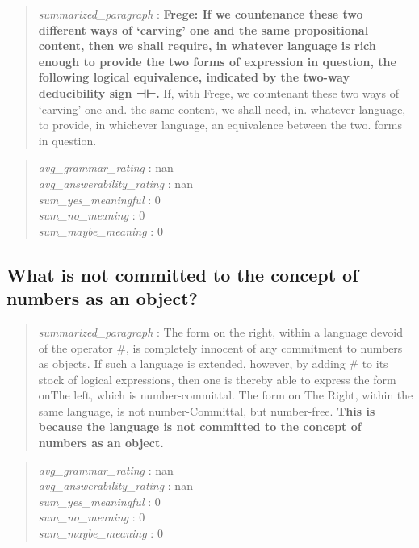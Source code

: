 \begin{quote}
\emph{summarized\_paragraph} : \textbf{Frege: If we countenance these
two different ways of `carving' one and the same propositional content,
then we shall require, in whatever language is rich enough to provide
the two forms of expression in question, the following logical
equivalence, indicated by the two-way deducibility sign ⊣⊢.} If, with
Frege, we countenant these two ways of `carving' one and. the same
content, we shall need, in. whatever language, to provide, in whichever
language, an equivalence between the two. forms in question.
\end{quote}

\begin{quote}
\emph{avg\_grammar\_rating} : nan\\
\emph{avg\_answerability\_rating} : nan\\
\emph{sum\_yes\_meaningful} : 0\\
\emph{sum\_no\_meaning} : 0\\
\emph{sum\_maybe\_meaning} : 0
\end{quote}

\hypertarget{what-is-not-committed-to-the-concept-of-numbers-as-an-object}{%
\subsection{What is not committed to the concept of numbers as an
object?}\label{what-is-not-committed-to-the-concept-of-numbers-as-an-object}}

\begin{quote}
\emph{summarized\_paragraph} : The form on the right, within a language
devoid of the operator \#, is completely innocent of any commitment to
numbers as objects. If such a language is extended, however, by adding
\# to its stock of logical expressions, then one is thereby able to
express the form onThe left, which is number-committal. The form on The
Right, within the same language, is not number-Committal, but
number-free. \textbf{This is because the language is not committed to
the concept of numbers as an object.}
\end{quote}

\begin{quote}
\emph{avg\_grammar\_rating} : nan\\
\emph{avg\_answerability\_rating} : nan\\
\emph{sum\_yes\_meaningful} : 0\\
\emph{sum\_no\_meaning} : 0\\
\emph{sum\_maybe\_meaning} : 0
\end{quote}

